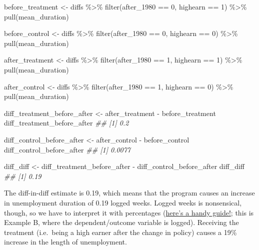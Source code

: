 \documentclass[
  letterpaper,
  DIV=11,
  numbers=noendperiod]{scrartcl}
\newenvironment{Shaded}{\begin{snugshade}}{\end{snugshade}}
\newcommand{\DecValTok}[1]{\textcolor[rgb]{0.68,0.00,0.00}{#1}}
\newcommand{\DocumentationTok}[1]{\textcolor[rgb]{0.37,0.37,0.37}{\textit{#1}}}
\newcommand{\FunctionTok}[1]{\textcolor[rgb]{0.28,0.35,0.67}{#1}}
\newcommand{\NormalTok}[1]{\textcolor[rgb]{0.00,0.23,0.31}{#1}}
\newcommand{\OtherTok}[1]{\textcolor[rgb]{0.00,0.23,0.31}{#1}}
\newcommand{\SpecialCharTok}[1]{\textcolor[rgb]{0.37,0.37,0.37}{#1}}
\begin{document}
\begin{Shaded}
\begin{Highlighting}[]
\NormalTok{before\_treatment }\OtherTok{\textless{}{-}}\NormalTok{ diffs }\SpecialCharTok{\%\textgreater{}\%}
  \FunctionTok{filter}\NormalTok{(after\_1980 }\SpecialCharTok{==} \DecValTok{0}\NormalTok{, highearn }\SpecialCharTok{==} \DecValTok{1}\NormalTok{) }\SpecialCharTok{\%\textgreater{}\%}
  \FunctionTok{pull}\NormalTok{(mean\_duration)}

\NormalTok{before\_control }\OtherTok{\textless{}{-}}\NormalTok{ diffs }\SpecialCharTok{\%\textgreater{}\%}
  \FunctionTok{filter}\NormalTok{(after\_1980 }\SpecialCharTok{==} \DecValTok{0}\NormalTok{, highearn }\SpecialCharTok{==} \DecValTok{0}\NormalTok{) }\SpecialCharTok{\%\textgreater{}\%}
  \FunctionTok{pull}\NormalTok{(mean\_duration)}

\NormalTok{after\_treatment }\OtherTok{\textless{}{-}}\NormalTok{ diffs }\SpecialCharTok{\%\textgreater{}\%}
  \FunctionTok{filter}\NormalTok{(after\_1980 }\SpecialCharTok{==} \DecValTok{1}\NormalTok{, highearn }\SpecialCharTok{==} \DecValTok{1}\NormalTok{) }\SpecialCharTok{\%\textgreater{}\%}
  \FunctionTok{pull}\NormalTok{(mean\_duration)}

\NormalTok{after\_control }\OtherTok{\textless{}{-}}\NormalTok{ diffs }\SpecialCharTok{\%\textgreater{}\%}
  \FunctionTok{filter}\NormalTok{(after\_1980 }\SpecialCharTok{==} \DecValTok{1}\NormalTok{, highearn }\SpecialCharTok{==} \DecValTok{0}\NormalTok{) }\SpecialCharTok{\%\textgreater{}\%}
  \FunctionTok{pull}\NormalTok{(mean\_duration)}

\NormalTok{diff\_treatment\_before\_after }\OtherTok{\textless{}{-}}\NormalTok{ after\_treatment }\SpecialCharTok{{-}}\NormalTok{ before\_treatment}
\NormalTok{diff\_treatment\_before\_after}
\DocumentationTok{\#\# [1] 0.2}

\NormalTok{diff\_control\_before\_after }\OtherTok{\textless{}{-}}\NormalTok{ after\_control }\SpecialCharTok{{-}}\NormalTok{ before\_control}
\NormalTok{diff\_control\_before\_after}
\DocumentationTok{\#\# [1] 0.0077}

\NormalTok{diff\_diff }\OtherTok{\textless{}{-}}\NormalTok{ diff\_treatment\_before\_after }\SpecialCharTok{{-}}\NormalTok{ diff\_control\_before\_after}
\NormalTok{diff\_diff}
\DocumentationTok{\#\# [1] 0.19}
\end{Highlighting}
\end{Shaded}

The diff-in-diff estimate is 0.19, which means that the program causes
an increase in unemployment duration of 0.19 logged weeks. Logged weeks
is nonsensical, though, so we have to interpret it with percentages
(\href{https://stats.stackexchange.com/a/18639/3025}{here's a handy
guide!}; this is Example B, where the dependent/outcome variable is
logged). Receiving the treatment (i.e.~being a high earner after the
change in policy) causes a 19\% increase in the length of unemployment.
\end{document}
